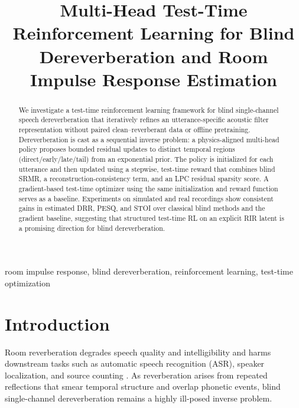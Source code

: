 \documentclass[10pt,conference]{IEEEtran}
\title{Multi-Head Test-Time Reinforcement Learning for Blind Dereverberation and Room Impulse Response Estimation}
\begin{document}
\author{%
%
%
%
}

\maketitle

\begin{abstract}
We investigate a test-time reinforcement learning framework for blind single-channel speech dereverberation that iteratively refines an utterance-specific acoustic filter representation without paired clean--reverberant data or offline pretraining. Dereverberation is cast as a sequential inverse problem: a physics-aligned multi-head policy proposes bounded residual updates to distinct temporal regions (direct/early/late/tail) from an exponential prior. The policy is initialized for each utterance and then updated using a stepwise, test-time reward that combines blind SRMR, a reconstruction-consistency term, and an LPC residual sparsity score. A gradient-based test-time optimizer using the same initialization and reward function serves as a baseline. Experiments on simulated and real recordings show consistent gains in estimated DRR, PESQ, and STOI over classical blind methods and the gradient baseline, suggesting that structured test-time RL on an explicit RIR latent is a promising direction for blind dereverberation.
\end{abstract}

\begin{IEEEkeywords}
room impulse response, blind dereverberation, reinforcement learning, test-time optimization
\end{IEEEkeywords}

\section{Introduction}

Room reverberation degrades speech quality and intelligibility and harms downstream tasks such as automatic speech recognition (ASR), speaker localization, and source counting \cite{8282303}. As reverberation arises from repeated reflections that smear temporal structure and overlap phonetic events, blind single-channel dereverberation remains a highly ill-posed inverse problem.
\end{document}
